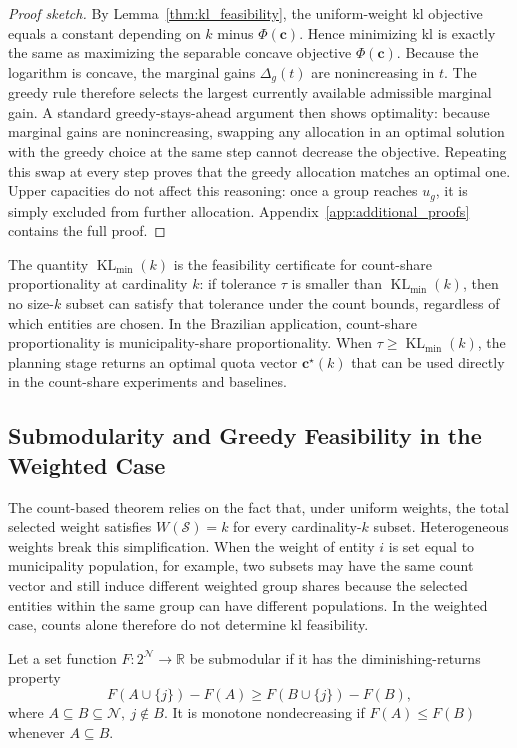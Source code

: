 \documentclass[10pt,journal]{IEEEtran}
\newcommand{\1}{\mathbf{1}}
\newcommand{\bc}{\mathbf{c}}
\newcommand{\Sel}{\mathcal{S}}
\DeclareMathOperator{\KL}{KL}
\theoremstyle{ieeethm}
\newenvironment{proofsketch}{\begin{proof}[Proof sketch]}{\end{proof}}
\begin{document}
\begin{proofsketch} \enspace
By Lemma~\ref{thm:kl_feasibility}, the uniform-weight \gls{kl} objective equals a constant depending on $k$ minus $\Phi(\bc)$. Hence minimizing \gls{kl} is exactly the same as maximizing the separable concave objective $\Phi(\bc)$. Because the logarithm is concave, the marginal gains $\Delta_g(t)$ are nonincreasing in $t$. The greedy rule therefore selects the largest currently available admissible marginal gain. A standard greedy-stays-ahead argument then shows optimality: because marginal gains are nonincreasing, swapping any allocation in an optimal solution with the greedy choice at the same step cannot decrease the objective. Repeating this swap at every step proves that the greedy allocation matches an optimal one. Upper capacities do not affect this reasoning: once a group reaches $u_g$, it is simply excluded from further allocation. Appendix~\ref{app:additional_proofs} contains the full proof.
\end{proofsketch}

The quantity $\KL_{\min}(k)$ is the feasibility certificate for count-share proportionality at cardinality $k$: if tolerance $\tau$ is smaller than $\KL_{\min}(k)$, then no size-$k$ subset can satisfy that tolerance under the count bounds, regardless of which entities are chosen. In the Brazilian application, count-share proportionality is municipality-share proportionality. When $\tau \ge \KL_{\min}(k)$, the planning stage returns an optimal quota vector $\bc^\star(k)$ that can be used directly in the count-share experiments and baselines.

\subsection{Submodularity and Greedy Feasibility in the Weighted Case}
\label{subsec:weighted_thm}

The count-based theorem relies on the fact that, under uniform weights, the total selected weight satisfies $W(\Sel)=k$ for every cardinality-$k$ subset. Heterogeneous weights break this simplification. When the weight of entity $i$ is set equal to municipality population, for example, two subsets may have the same count vector and still induce different weighted group shares because the selected entities within the same group can have different populations. In the weighted case, counts alone therefore do not determine \gls{kl} feasibility.

Let a set function $F:2^{\mathcal{N}}\to\mathbb{R}$ be submodular if it has the diminishing-returns property
\begin{equation*}
F(A\cup\{j\})-F(A)\ge F(B\cup\{j\})-F(B),
\end{equation*}
where $A\subseteq B\subseteq\mathcal{N},\ j\notin B$. It is monotone nondecreasing if $F(A) \le F(B)$ whenever $A\subseteq B$. 
\end{document}
